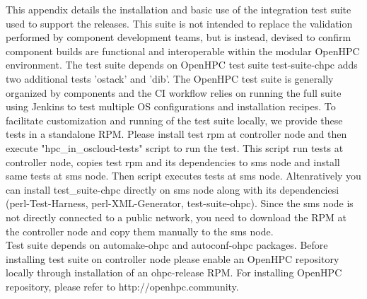 This appendix details the installation and basic use of the integration test suite used to support the releases. This suite is not intended to replace the validation performed by component development teams, but is instead, devised to confirm component builds are functional and interoperable within the modular OpenHPC environment. The test suite depends on OpenHPC test suite test-suite-chpc adds two additional tests 'ostack' and 'dib'. The OpenHPC test suite is generally organized by components and the CI workflow relies on running the full suite using Jenkins to test multiple OS configurations and installation recipes. To facilitate customization and running of the test suite locally, we provide these tests in a standalone RPM. Please install test rpm at controller node and then execute "hpc\_in\_oscloud-tests" script to run the test. This script run tests at controller node, copies test rpm  and its dependencies to sms node and install same tests at sms node. Then script executes tests at sms node. Altenratively you can install test\_suite-chpc directly on sms node along with its dependenciesi (perl-Test-Harness, perl-XML-Generator, test-suite-ohpc). Since the sms node is not directly connected to a public network, you need to download the RPM at the controller node and copy them manually to the sms node. \\
Test suite depends on automake-ohpc and autoconf-ohpc packages. Before installing test suite on controller node please enable an OpenHPC repository locally through installation of an ohpc-release RPM. For installing OpenHPC repository, please refer to http://openhpc.community.

